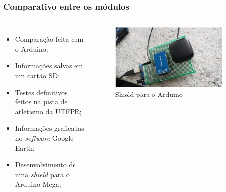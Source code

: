 \begin{frame}
\frametitle{Comparativo entre os módulos}
\begin{columns}

	\begin{itemize}
	\item Comparação feita com o Arduino;
	\item Informações salvas em um cartão SD;
	\item Testes definitivos feitos na pista de atletismo da UTFPR;
	\item Informações graficadas no \textit{software} Google Earth;
	\item Desenvolvimento de uma \textit{shield} para o Arduino Mega;
	\end{itemize}

	\begin{figure}[]
	 \centering
	 \captionsetup{width=0.9\textwidth,font=footnotesize,textfont=bf}
	 \includegraphics[width=0.9\textwidth,keepaspectratio]{Figuras/shield.jpg}
	 \caption{Shield para o Arduino}
	\end{figure}
	
\end{columns}
\end{frame}




